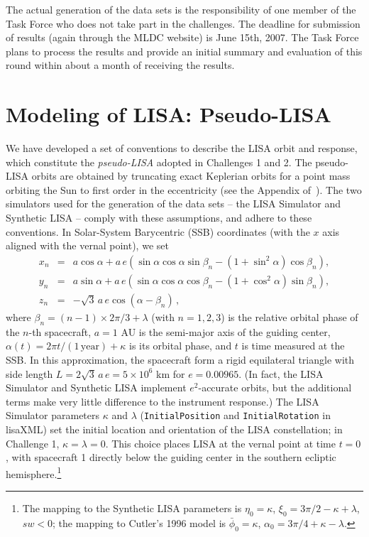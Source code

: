 \documentclass{iopart}
\begin{document}
The actual generation of the data sets is the responsibility of one member of the Task Force who does not take part in the challenges. The deadline for submission of results (again through the MLDC website) is June 15th, 2007. The Task Force plans to process the results and provide an initial summary and evaluation of this round within about a month of receiving the results.

\section{Modeling of LISA: Pseudo-LISA}
\label{s:lisa}

We have developed a set of conventions to describe the LISA orbit and response, which constitute the \emph{pseudo-LISA} adopted in Challenges 1 and 2. The pseudo-LISA orbits are obtained by truncating exact Keplerian orbits for a point mass orbiting the Sun to first order in the eccentricity (see the Appendix of~\cite{lisasimulator}). The two simulators used for the generation of the data sets -- the LISA Simulator \cite{lisasimulator} and Synthetic LISA \cite{synthlisa} -- comply with these assumptions, and adhere to these conventions. In Solar-System Barycentric (SSB) coordinates (with the $x$ axis aligned with the vernal point), we set
%
\begin{eqnarray}
x_n &=& a\cos \alpha + a \, e\left(\sin\alpha\cos\alpha\sin\beta_n
-(1+\sin^2\alpha)\cos\beta_n\right), \nonumber \\
y_n &=& a\sin \alpha + a \, e\left(\sin\alpha\cos\alpha\cos\beta_n
-(1+\cos^2\alpha)\sin\beta_n\right), \\
z_n & = & -\sqrt{3} \, a \, e \cos(\alpha-\beta_n) \, , \nonumber
\end{eqnarray}
%
where $\beta_n = (n-1)\times2\pi/3 + \lambda$ (with $n=1, 2, 3$) is the relative orbital phase of the $n$-th spacecraft, $a = 1$ AU is the semi-major axis of the guiding center, $\alpha(t)=2 \pi t / (1 \, \mathrm{year}) + \kappa$ is its orbital phase, and $t$ is time measured at the SSB. In this approximation, the spacecraft form a rigid equilateral triangle with side length $L = 2\sqrt{3} \, a \, e = 5\times 10^6$ km for $e=0.00965$. (In fact, the LISA Simulator and Synthetic LISA implement $e^2$-accurate orbits, but the additional terms make very little difference to the instrument response.) The LISA Simulator parameters $\kappa$ and $\lambda$ (\texttt{InitialPosition} and \texttt{InitialRotation} in lisaXML) set the initial location and orientation of the LISA constellation; in Challenge 1, $\kappa=\lambda=0$. This choice places LISA at the vernal point at time $t=0$, with spacecraft 1 directly below the guiding center in the southern ecliptic hemisphere.\footnote{The mapping to the Synthetic LISA \cite{synthlisa} parameters is $\eta_0 = \kappa$, $\xi_0 = 3\pi/2 - \kappa + \lambda$, $sw < 0$; the mapping to Cutler's 1996 model \cite{cutler98} is $\bar{\phi}_0 = \kappa$, $\alpha_0 = 3\pi/4 + \kappa - \lambda$.}
\end{document}

